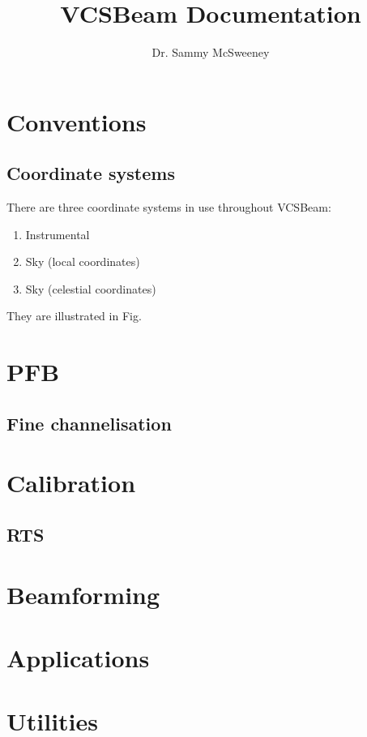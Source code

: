 \documentclass{book}
\title{VCSBeam Documentation}
\author{Dr. Sammy McSweeney}
\begin{document}
\maketitle

\tableofcontents

\chapter{Conventions}

\section{Coordinate systems}

There are three coordinate systems in use throughout VCSBeam:
\begin{enumerate}
    \item Instrumental
    \item Sky (local coordinates)
    \item Sky (celestial coordinates)
\end{enumerate}
They are illustrated in Fig.

\chapter{PFB}

\section{Fine channelisation}

\chapter{Calibration}

\section{RTS}

\chapter{Beamforming}

\chapter{Applications}

\chapter{Utilities}
\end{document}
